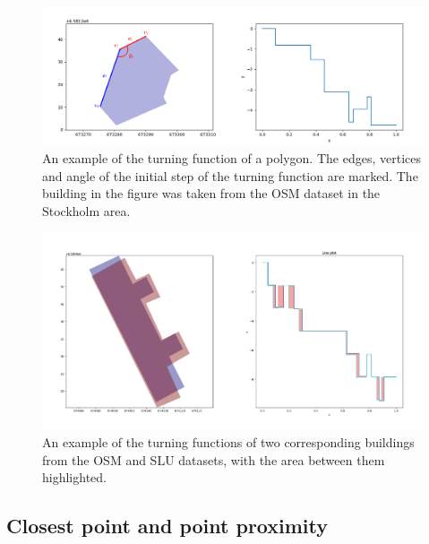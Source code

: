 \documentclass{kththesis}
\begin{document}
\begin{figure}[H]
    \centering
    \includegraphics[width=\textwidth,height=0.5\textheight,keepaspectratio]{img_turn_function}
    \caption{An example of the turning function of a polygon. The edges, vertices and angle of the initial step of the turning function are marked. The building in the figure was taken from the OSM dataset in the Stockholm area.}
    \label{fig:turning-function}
\end{figure}

\begin{figure}[H]
    \centering
    \includegraphics[width=\textwidth,height=0.5\textheight,keepaspectratio]{img_turn_function_diff_filled}
    \caption{An example of the turning functions of two corresponding buildings from the OSM and SLU datasets, with the area between them highlighted.}
    \label{fig:turning-function-compare}
\end{figure}

\subsection{Closest point and point proximity}
\end{document}
